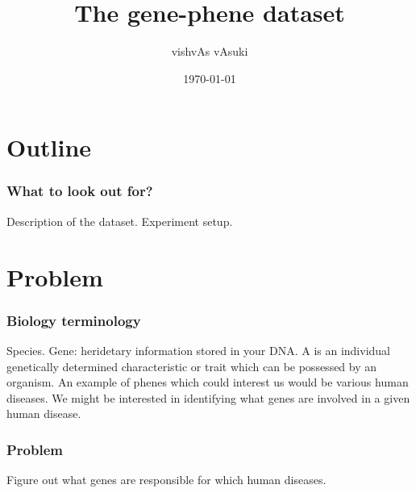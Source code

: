 \documentclass{beamer}
\title{The gene-phene dataset}
\author{vishvAs vAsuki}
\date{\today}
\begin{document}



\frame{\titlepage}

\section{Outline}

\begin{frame}
\frametitle{What to look out for?}
\begin{itemize}
\pitem Description of the dataset.
\pitem Experiment setup.
\end{itemize}
\end{frame}

\section{Problem}
\begin{frame}
\frametitle{Biology terminology}
\begin{itemize}
\pitem Species.
\pitem Gene: heridetary information stored in your DNA. 
\pitem A  is an individual genetically determined characteristic or trait which can be possessed by an organism. An example of phenes which could interest us would be various human diseases. We might be interested in identifying what genes are involved in a given human disease.
\end{itemize}
\end{frame}

\begin{frame}
\frametitle{Problem}
\begin{itemize}
\pitem Figure out what genes are responsible for which human diseases.
\end{itemize}
\end{frame}
\end{document}
